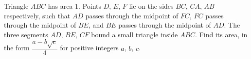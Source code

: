 Triangle $ABC$ has area $1$. Points $D$, $E$, $F$ lie on the sides $BC$, $CA$, $AB$ respectively, such that $AD$ passes through the midpoint of $FC$, $FC$ passes through the midpoint of $BE$, and $BE$ passes through the midpoint of $AD$. The three segments $AD$, $BE$, $CF$ bound a small triangle inside $ABC$. Find its area, in the form $\dfrac{a-b\sqrt c}{4}$ for positive integers $a$, $b$, $c$.
